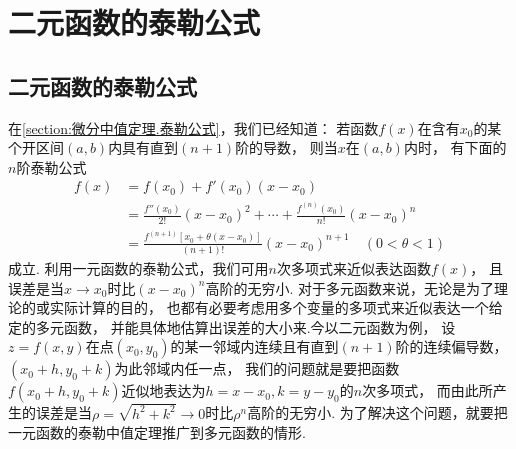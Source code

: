 \section{二元函数的泰勒公式}
\subsection{二元函数的泰勒公式}
在\cref{section:微分中值定理.泰勒公式}，我们已经知道：
若函数\(f(x)\)在含有\(x_0\)的某个开区间\((a,b)\)内具有直到\((n+1)\)阶的导数，
则当\(x\)在\((a,b)\)内时，
有下面的\(n\)阶泰勒公式\begin{align*}
	f(x) &= f(x_0) + f'(x_0) (x-x_0) \\
	&=\frac{f''(x_0)}{2!} (x-x_0)^2 + \dotsb + \frac{f^{(n)}(x_0)}{n!} (x-x_0)^n \\
	&=\frac{f^{(n+1)}[x_0+\theta(x-x_0)]}{(n+1)!} (x-x_0)^{n+1}
	\quad(0<\theta<1)
\end{align*}成立.
利用一元函数的泰勒公式，我们可用\(n\)次多项式来近似表达函数\(f(x)\)，
且误差是当\(x \to x_0\)时比\((x-x_0)^n\)高阶的无穷小.
对于多元函数来说，无论是为了理论的或实际计算的目的，
也都有必要考虑用多个变量的多项式来近似表达一个给定的多元函数，
并能具体地估算出误差的大小来.今以二元函数为例，
设\(z=f(x,y)\)在点\((x_0,y_0)\)的某一邻域内连续且有直到\((n+1)\)阶的连续偏导数，
\((x_0+h,y_0+k)\)为此邻域内任一点，
我们的问题就是要把函数\(f(x_0+h,y_0+k)\)近似地表达为\(h=x-x_0,k=y-y_0\)的\(n\)次多项式，
而由此所产生的误差是当\(\rho=\sqrt{h^2+k^2}\to0\)时比\(\rho^n\)高阶的无穷小.
为了解决这个问题，就要把一元函数的泰勒中值定理推广到多元函数的情形.


